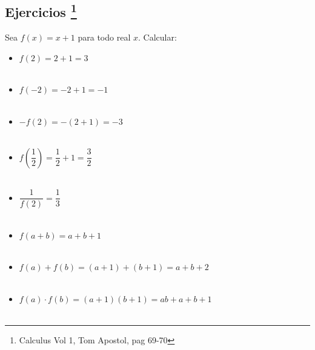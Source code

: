 \subsection[Ejercicios]{Ejercicios \footnote{Calculus Vol 1, Tom Apostol, pag 69-70}}
\begin{ej}
Sea $f(x)=x+1$ para todo real $x$. Calcular:
\begin{itemize}
\item $f(2) = 2+1 = 3$\\\\
\item $f(-2) = -2 +1 = -1$\\\\
\item $-f(2) = -(2+1)=-3$\\\\
\item $f \left( \dfrac{1}{2} \right) = \dfrac{1}{2} + 1 = \dfrac{3}{2}$\\\\
\item $\dfrac{1}{f(2)}= \dfrac{1}{3}$\\\\
\item $f(a+b) = a+b+1$\\\\
\item $f(a)+f(b)= (a+1) + (b+1) = a+b+2$\\\\
\item $f(a) \cdot f(b) = (a+1)(b+1) = ab + a + b + 1$\\\\
\end{itemize}
\end{ej}

